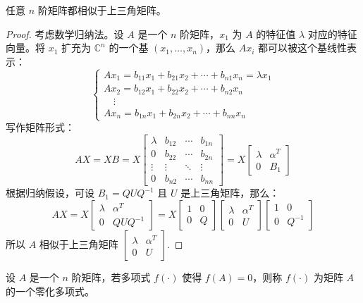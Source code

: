 \begin{theorem}
\label{thm:anysimilar}
任意 $n$ 阶矩阵都相似于上三角矩阵。
\end{theorem}
\begin{proof}
考虑数学归纳法。设 $A$ 是一个 $n$ 阶矩阵，$x_1$ 为 $A$ 的特征值 $\lambda$ 对应的特征向量。将 $x_1$ 扩充为 $\mathbb C^n$ 的一个基 $(x_1,\ldots,x_n)$，那么 $Ax_i$ 都可以被这个基线性表示：
\[
    \begin{cases}
    Ax_1=b_{11}x_1+b_{21}x_2+\cdots+b_{n1}x_n=\lambda x_1\\
    Ax_2=b_{12}x_1+b_{22}x_2+\cdots+b_{n2}x_n\\
    \quad\vdots\\
    Ax_n=b_{1n}x_1+b_{2n}x_2+\cdots+b_{nn}x_n
    \end{cases}
\]
写作矩阵形式：
\[
    AX=XB=X\begin{bmatrix}\lambda&b_{12}&\cdots&b_{1n}\\0&b_{22}&\cdots&b_{2n}\\\vdots&\vdots&\ddots&\vdots\\0&b_{n2}&\cdots&b_{nn}\end{bmatrix}=X\begin{bmatrix}\lambda&\alpha^T\\0&B_1\end{bmatrix}
\]
根据归纳假设，可设 $B_1=QUQ^{-1}$ 且 $U$ 是上三角矩阵，那么：
\[
    AX=X\begin{bmatrix}\lambda&\alpha^T\\0&QUQ^{-1}\end{bmatrix}=X\begin{bmatrix}1&0\\0&Q\end{bmatrix}\begin{bmatrix}\lambda&\alpha^T\\0&U\end{bmatrix}\begin{bmatrix}1&0\\0&Q^{-1}\end{bmatrix}
\]
所以 $A$ 相似于上三角矩阵 $\begin{bmatrix}\lambda&\alpha^T\\0&U\end{bmatrix}$.
\end{proof}

\begin{definition}[零化多项式]
设 $A$ 是一个 $n$ 阶矩阵，若多项式 $f(\cdot)$ 使得 $f(A)=0$，则称 $f(\cdot)$ 为矩阵 $A$ 的一个零化多项式。
\end{definition}

